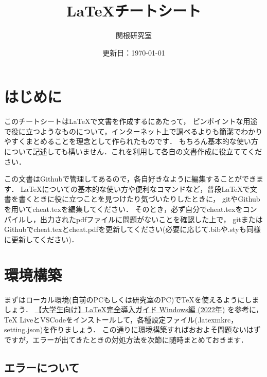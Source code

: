 \documentclass[a4paper, 11pt, uplatex]{jsreport}
\numberwithin{equation}{section}
\theoremstyle{definition}
\begin{document}
\title{{\LaTeX}チートシート}
\author{関根研究室}
\date{更新日：\today}
\maketitle



\chapter*{はじめに}

このチートシートは{\LaTeX}で文書を作成するにあたって，
ピンポイントな用途で役に立つようなものについて，インターネット上で調べるよりも簡潔でわかりやすくまとめることを理念として作られたものです．
もちろん基本的な使い方について記述しても構いません．これを利用して各自の文書作成に役立ててください．

この文書はGithubで管理してあるので，各自好きなように編集することができます．
{\LaTeX}についての基本的な使い方や便利なコマンドなど，普段{\LaTeX}で文書を書くときに役に立つことを見つけたり気づいたりしたときに，
gitやGithubを用いてcheat.texを編集してください．
そのとき，必ず自分でcheat.texをコンパイルし，出力されたpdfファイルに問題がないことを確認した上で，
gitまたはGithubでcheat.texとcheat.pdfを更新してください(必要に応じて.bibや.styも同様に更新してください)．



\setcounter{tocdepth}{3}
\tableofcontents



\chapter{環境構築}

まずはローカル環境(自前のPCもしくは研究室のPC)でTeXを使えるようにしましょう．
\href{https://qiita.com/passive-radio/items/623c9a35e86b6666b89e}{【大学生向け】LaTeX完全導入ガイド Windows編 (2022年)}
を参考に，TeX LiveとVSCodeをインストールして，各種設定ファイル(.latexmkrc，setting.json)を作りましょう．
この通りに環境構築すればおおよそ問題ないはずですが，エラーが出てきたときの対処方法を次節に随時まとめておきます．


\section{エラーについて}
\end{document}
